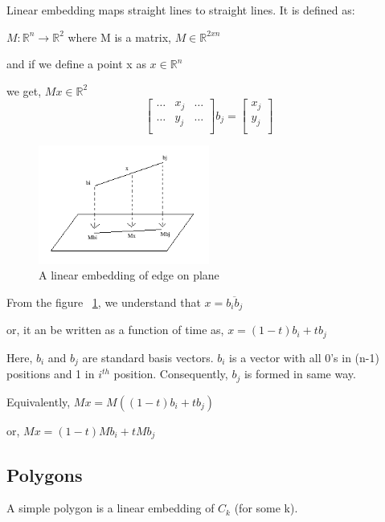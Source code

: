 \documentclass{article}
\begin{document}
Linear embedding maps straight lines to straight lines. It is defined as:

$M: \mathbb{R}^n \longrightarrow \mathbb{R}^2$  where M is a matrix, $M \in \mathbb{R}^{2xn}$

and if we define a point x as $x \in \mathbb{R}^n$

we get, $Mx \in \mathbb{R}^2$\\

\[
\begin{bmatrix}
    \dots   & x_{j}  & \dots  \\
    \dots   & y_{j}  & \dots  \\
\end{bmatrix}
b_{j}
=
\begin{bmatrix}
    x_{j}  \\
    y_{j}  \\
\end{bmatrix}
\]

\begin{figure}[h]
    \centering
    \includegraphics[width=0.5\textwidth]{images/fig4-12.png}
    \caption{A linear embedding of edge on plane}
    \label{fig:fig4-12}
\end{figure}

From the figure ~\ref{fig:fig4-12}, we understand that $x = \overline{{b_i}{b_j}}$

or, it an be written as a function of time as, $x = (1-t)b_i + tb_j$

Here, $b_i$ and $b_j$ are standard basis vectors. $b_i$ is a vector with all 0's in (n-1) positions and 1 in $i^{th}$ position. Consequently, $b_j$ is formed in same way.

Equivalently, $Mx = M((1-t)b_i + tb_j)$

or, $Mx = (1-t)Mb_i + tMb_j$

\subsection{Polygons}

A simple polygon is a linear embedding of $C_k$ (for some k).
\end{document}
